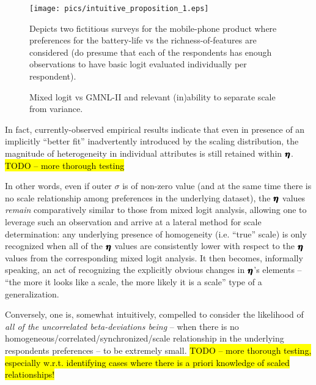 \documentclass[12pt,a4paper]{article}
\begin{document}
\begin{figure}[H]
\begin{framed}
\texttt{[image: pics/intuitive\_proposition\_1.eps]}

Depicts two fictitious surveys for the mobile-phone product where preferences for the battery-life vs the richness-of-features are considered (do presume that each of the respondents has enough observations to have basic logit evaluated individually per respondent).

\caption{Mixed logit vs GMNL-II and relevant (in)ability to separate scale from variance.} 

\label{fig:variances_compared_1}
\end{framed}
\end{figure}

In fact, currently-observed empirical results indicate that even in presence of an implicitly ``better fit'' inadvertently introduced by the scaling distribution, the magnitude of heterogeneity in individual attributes  is still retained within \(\pmb{\hm{\eta}}\). \hl{TODO -- more thorough testing}

In other words, even if outer \(\sigma\) is of non-zero value (and at the same time there is no scale relationship among preferences in the underlying dataset), the \(\pmb{\hm{\eta}}\) values \textit{remain} comparatively similar to those from mixed logit analysis, allowing one to leverage such an observation and arrive at a lateral method for scale determination: any underlying presence of homogeneity (i.e. ``true'' scale) is only recognized when all of the \(\pmb{\hm{\eta}}\) values are consistently lower with respect to the \(\pmb{\hm{\eta}}\) values from the corresponding mixed logit analysis. It then becomes, informally speaking, an act of recognizing the explicitly obvious changes in \(\pmb{\hm{\eta}}\)'s elements -- ``the more it looks like a scale, the more likely it is a scale'' type of a generalization.

Conversely, one is, somewhat intuitively, compelled to consider the likelihood of \textit{all of the uncorrelated beta-deviations being } -- when there is no homogeneous/correlated/synchronized/scale relationship in the underlying respondents preferences -- to be extremely small. \hl{TODO -- more thorough testing, especially w.r.t. identifying cases where there is a priori knowledge of scaled relationships!}
\end{document}

